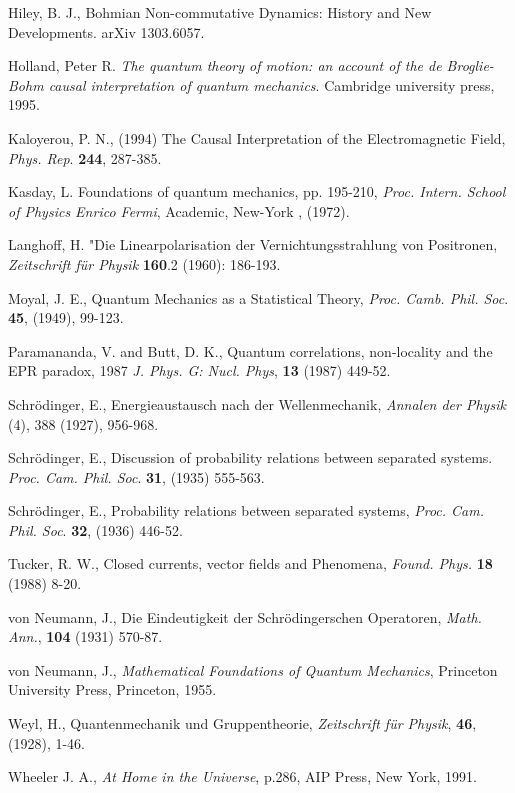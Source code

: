 \documentclass[11pt]{article}
\begin{document}
\begin{thebibliography}{99}
 Hiley, B. J., Bohmian Non-commutative Dynamics: History and New Developments. arXiv 1303.6057.

 Holland, Peter R. {\em The quantum theory of motion: an account of the de Broglie-Bohm causal interpretation of quantum mechanics}. Cambridge university press, 1995.

 Kaloyerou, P. N., (1994) The Causal Interpretation of the Electromagnetic Field, {\em Phys. Rep}. {\bf 244}, 287-385.

 Kasday, L. Foundations of quantum mechanics,  pp. 195-210, {\em Proc. Intern. School of Physics Enrico Fermi}, Academic, New-York ,  (1972).


 Langhoff, H. "Die Linearpolarisation der Vernichtungsstrahlung von Positronen, {\em Zeitschrift f\"{u}r Physik} {\bf 160}.2 (1960): 186-193.

  Moyal, J. E., Quantum Mechanics as a Statistical Theory, {\em Proc. Camb. Phil. Soc}. {\bf 45}, (1949), 99-123.


   Paramananda, V. and  Butt, D. K., Quantum correlations, non-locality and the EPR paradox, 1987 {\em J. Phys. G: Nucl. Phys}, {\bf 13} (1987)  449-52.

  Schr\"{o}dinger, E., Energieaustausch nach der Wellenmechanik, {\em Annalen der Physik} (4), 388 (1927), 956-968. 

 Schr\"{o}dinger, E., Discussion of probability relations between separated systems.  {\em Proc. Cam. Phil. Soc}.  {\bf 31}, (1935) 555-563.

 Schr\"{o}dinger, E., Probability relations between separated systems, {\em Proc. Cam. Phil. Soc}.  {\bf 32}, (1936) 446-52. 

 Tucker, R. W., Closed currents, vector fields and Phenomena, {\em Found. Phys.} {\bf 18} (1988) 8-20.

 von Neumann, J., Die Eindeutigkeit der Schr\"{o}dingerschen Operatoren, {\em Math. Ann.}, {\bf 104} (1931) 570-87.

 von Neumann, J., {\em Mathematical Foundations of Quantum Mechanics}, Princeton University Press, Princeton, 1955.

  Weyl, H.,  Quantenmechanik und Gruppentheorie, {\em Zeitschrift f\"{u}r Physik}, {\bf 46}, (1928), 1-46.

 Wheeler J. A.,  {\em At Home in the Universe}, p.286, AIP Press, New York, 1991.


\end{thebibliography}
\end{document}
